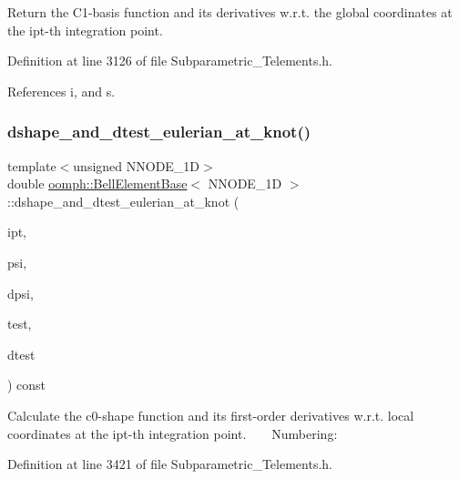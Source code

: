 Return the C1-\/basis function and its derivatives w.\+r.\+t. the global coordinates at the ipt-\/th integration point. 



Definition at line 3126 of file Subparametric\+\_\+\+Telements.\+h.



References i, and s.

\mbox{\label{classoomph_1_1BellElementBase_ade54f5038bd917ff2a4c636e066db00e}} 
\subsubsection{\texorpdfstring{dshape\+\_\+and\+\_\+dtest\+\_\+eulerian\+\_\+at\+\_\+knot()}{dshape\_and\_dtest\_eulerian\_at\_knot()}}
{\footnotesize\ttfamily template$<$unsigned N\+N\+O\+D\+E\+\_\+1D$>$ \\
double \hyperlink{classoomph_1_1BellElementBase}{oomph\+::\+Bell\+Element\+Base}$<$ N\+N\+O\+D\+E\+\_\+1D $>$\+::dshape\+\_\+and\+\_\+dtest\+\_\+eulerian\+\_\+at\+\_\+knot (\begin{DoxyParamCaption}\item[{const unsigned \&}]{ipt,  }\item[{\hyperlink{classoomph_1_1Shape}{Shape} \&}]{psi,  }\item[{\hyperlink{classoomph_1_1DShape}{D\+Shape} \&}]{dpsi,  }\item[{\hyperlink{classoomph_1_1Shape}{Shape} \&}]{test,  }\item[{\hyperlink{classoomph_1_1DShape}{D\+Shape} \&}]{dtest }\end{DoxyParamCaption}) const\hspace{0.3cm}{\ttfamily [inline]}}

Calculate the c0-\/shape function and its first-\/order derivatives w.\+r.\+t. local coordinates at the ipt-\/th integration point. ~\newline
~\newline
 Numbering\+: 

Definition at line 3421 of file Subparametric\+\_\+\+Telements.\+h.

